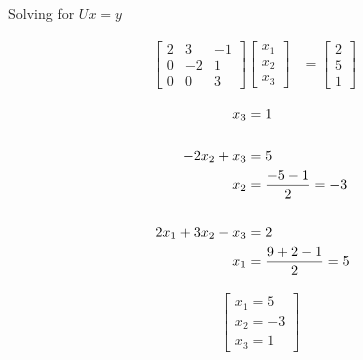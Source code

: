 	Solving for $Ux = y$

	\begin{align}
		\begin{bmatrix}
			2 & 3 & -1 \\[0.3em]
			0 & -2 & 1 \\[0.3em]
			0 & 0 & 3
		\end{bmatrix}
		\begin{bmatrix}
			x_{1} \\[0.3em]
			x_{2} \\[0.3em]
			x_{3}
		\end{bmatrix}&= \begin{bmatrix}
			2 \\[0.3em]
			5 \\[0.3em]
			1
		\end{bmatrix}&
	\label{eq:63x}
	\end{align}	

	\begin{align}
		x_{3} &= 1& \\
		\notag \\
		-2x_{2} + x_{3} &= 5& \notag \\
		x_{2} &= \frac{-5-1}{2} = -3& \\
		\notag \\
		2x_{1} + 3x_{2} - x_{3} &= 2& \notag \\
		x_{1} &=  \frac{9 + 2 - 1}{2} = 5&
	\end{align}

	\begin{align}
		&\begin{bmatrix}
			x_{1} = 5 \\[0.3em]
			x_{2} = -3 \\[0.3em]
			x_{3} = 1
		\end{bmatrix}&
	\label{eq:63result}
	\end{align}
